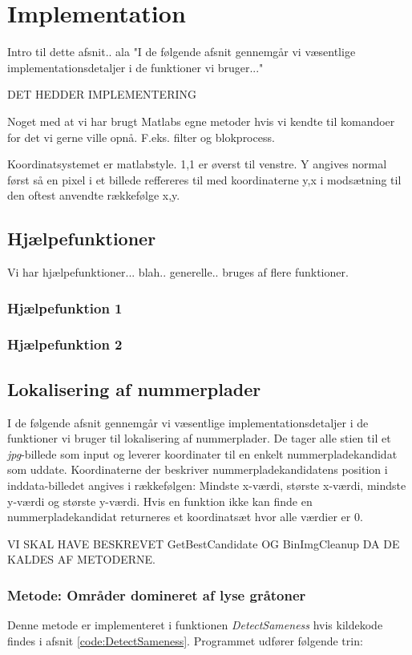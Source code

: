 \section{Implementation}
\label{sec:implementation}

Intro til dette afsnit.. ala "I de følgende afsnit gennemgår vi væsentlige implementationsdetaljer i de funktioner vi bruger..."

DET HEDDER IMPLEMENTERING

Noget med at vi har brugt Matlabs egne metoder hvis vi kendte til komandoer for det vi gerne ville opnå. F.eks. filter og blokprocess.

Koordinatsystemet er matlabstyle. 1,1 er øverst til venstre. Y angives normal først så en pixel i et billede reffereres til med koordinaterne y,x i modsætning til den oftest anvendte rækkefølge x,y. 

\subsection{Hjælpefunktioner}
Vi har hjælpefunktioner... blah.. generelle.. bruges af flere funktioner.
\subsubsection{Hjælpefunktion 1}
\subsubsection{Hjælpefunktion 2}

\subsection{Lokalisering af nummerplader}
I de følgende afsnit gennemgår vi væsentlige implementationsdetaljer i de funktioner vi bruger til lokalisering af nummerplader. De tager alle stien til et \textit{jpg}-billede som input og leverer koordinater til en enkelt nummerpladekandidat som uddate. Koordinaterne der beskriver nummerpladekandidatens position i inddata-billedet angives i rækkefølgen: Mindste x-værdi, største x-værdi, mindste y-værdi og største y-værdi. Hvis en funktion ikke kan finde en nummerpladekandidat returneres et koordinatsæt hvor alle værdier er 0.

VI SKAL HAVE BESKREVET GetBestCandidate OG BinImgCleanup DA DE KALDES AF METODERNE.


\subsubsection{Metode: Områder domineret af lyse gråtoner}
Denne metode er implementeret i funktionen \textit{DetectSameness} hvis kildekode findes i afsnit \vref{code:DetectSameness}. Programmet udfører følgende trin:


